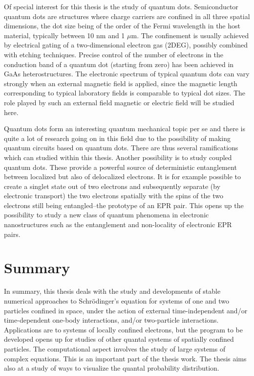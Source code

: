 \begin{enumerate}
Of special interest for this thesis is the study of quantum dots.
Semiconductor quantum dots are structures where
charge carriers are confined in all three spatial dimensions,
the dot size being of the order of the Fermi wavelength
in the host material, typically between  10 nm and  1 $\mu$m.
The confinement is usually achieved by electrical gating of a
two-dimensional electron gas (2DEG),
possibly combined with etching techniques. Precise control of the
number of electrons in the conduction band of a quantum dot
(starting from zero) has been achieved in GaAs heterostructures.
The electronic spectrum of typical quantum dots
can vary strongly when an external magnetic field is applied,
since the magnetic length corresponding to typical
laboratory fields  is comparable to typical dot sizes.
The role played by such an external field magnetic or electric field
will be studied here. 

Quantum dots form  an interesting quantum mechanical topic per se and 
there is quite a lot of 
research going on in this field due to the possibility of making
quantum circuits based on quantum dots. 
There are thus several ramifications which can studied within this thesis.
Another possibility is to study 
coupled quantum dots. These provide a powerful source of
deterministic entanglement between localized
but also of delocalized electrons. It is for example 
possible to create a singlet state out of two electrons
and subsequently separate (by electronic transport)
the two electrons spatially with the spins of the two electrons still being
entangled--the prototype of an EPR pair.
This opens up the possibility to study a new class
of quantum phenomena in electronic nanostructures
such as the entanglement and
non-locality of electronic EPR pairs.




\end{enumerate}

\section*{Summary}
In summary, this thesis deals with the study and developments of stable
numerical approaches to Schr\"odinger's equation for systems of one and
two particles confined in space, under the action of external time-independent and/or time-dependent one-body interactions, and/or
two-particle interactions. Applications are to systems of locally
confined electrons, but the program to be developed opens up for studies of
other quantal systems of spatially confined particles.
The computational aspect involves the study of large systems of 
complex equations. This is an important part of the thesis work. 
The thesis aims also at a study of ways to
visualize the quantal probability distribution.
 














